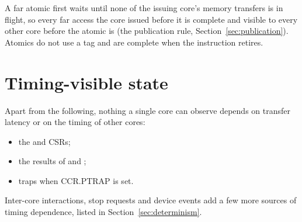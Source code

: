 A far atomic first waits until none of the issuing core's memory transfers is in flight, so every
far access the core issued before it is complete and visible to every other core before the atomic is (the
publication rule, Section~\ref{sec:publication}). Atomics do not use a tag and are complete when the
instruction retires.

\section{Timing-visible state}\label{sec:timing-visible}

Apart from the following, nothing a single core can observe depends on transfer latency or on the
timing of other cores:
\begin{itemize}
\item the  and  CSRs;
\item the results of  and ;
\item {} traps when CCR.PTRAP is set.
\end{itemize}
Inter-core interactions, stop requests and device events add a few more sources of timing
dependence, listed in Section~\ref{sec:determinism}.
